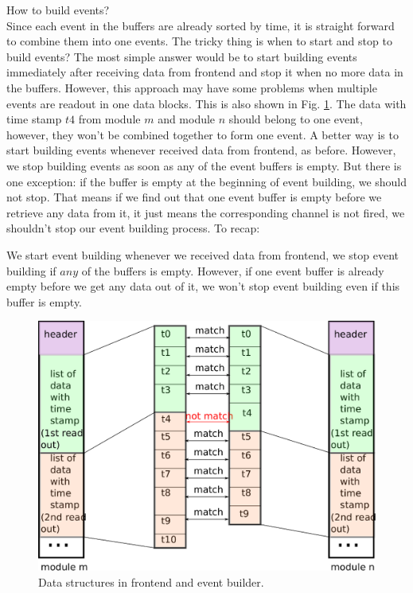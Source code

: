 \documentclass[a4paper,12pt]{article}
\begin{document}
	 How to build events?\\
	 Since each event in the buffers are already sorted by time, it is
	 straight forward to combine them into one events.
	 The tricky thing is when to start and stop to build
	 events? The most simple answer would be to start building events
	 immediately after receiving data from frontend and stop it when no more
	 data in the buffers. However, this approach may have some problems when
	 multiple events are readout in one data blocks. This is also shown in Fig.
	 \ref{fig04}. The data with time stamp $t4$ from module $m$ and module
	 $n$ should belong to one event, however, they won't be combined
	 together to form one event. A better way is to start building events
	 whenever received data from frontend, as before. However, we stop
	 building events as soon as any of the event buffers is empty. But there
	 is one exception: if the buffer is empty at the beginning of event
	 building, we should not stop. That means if we find out that one event
	 buffer is empty before we retrieve any data from it, it just means the
	 corresponding channel is not fired, we shouldn't stop our event
	 building process. To recap:
	 \begin{tcolorbox}
		 We start event building whenever we received data from frontend, we
		 stop event building if $any$ of the buffers is empty. However, if
		 one event buffer is already empty before we get any data out of it,
		 we won't stop event building even if this buffer is empty.
	 \end{tcolorbox}
	\begin{figure}
		\begin{center}
			\includegraphics[width=.5\textwidth]{figs/combine_evt.eps}
			\caption{\label{fig04}Data structures in frontend and event
			builder. }
		\end{center}
	\end{figure}



	    
\end{document}
